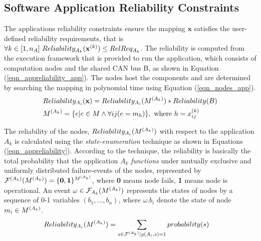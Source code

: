 \subsection{Software Application Reliability Constraints}\label{subsec_reliability_constraint}
The applications reliability constraints ensure the mapping $\textbf{x}$ satisfies the user-defined reliability requirements, that is $ \forall k\in [1,n_A]\ Reliability_{A_k}(\textbf{x}^{(k)})\leq RelReq_{A_k}$. 
The reliability  is computed from the execution framework that is provided to run the application, which consists of computation nodes  and the shared CAN bus B, as shown in Equation (\ref{eqn_appreliability_app}). The nodes  host the components  and are determined by searching the mapping   in polynomial time using Equation (\ref{eqn_nodes_app}).
\begin{align}
	\label{eqn_appreliability_app}
	&Reliability_{A_i}(\x)=Reliability_{A_i}(\ssp{M})*Reliability(B)\\
	\label{eqn_nodes_app}
	&\ssp{M}=\{e|e\in M \land \forall ij (e=m_h) \},\mbox{ where } h=\ssx{k}{ij} 
\end{align}

The reliability of the nodes, $Reliability_{A_i}(\ssp{M})$ with respect to the application ${A_k}$ is calculated using the \textit{state-enumeration} technique \cite{Lucet1999ExactReliability}  as shown in Equations (\ref{eqn_appreliability}). According to the technique, the reliability is basically the total probability that the application $A_k$ \textit{functions} under mutually exclusive and uniformly distributed failure-events of the nodes, represented by $\ssp{\mathcal{F}}(\ssp{M})=\{\textbf{0},\textbf{1}\}^{\ssp{M}}$, where  \textbf{0} means node fails, \textbf{1} means  node is operational. An event $\omega\in \mathcal{F}_{A_k}(\ssp{M})$ represents the states of nodes by a sequence of 0-1 variables $(b_1,...,b_n)$, where $\omega.b_i$ denote the state of node $m_i\in \ssp{M}$. %
\begin{align}
\label{eqn_appreliability}
Reliability_{A_i}(\ssp{M})&=\sum_{s\in \ssp{\mathcal{F}}|g(A_i, s)=1}probability(s)
\end{align}

